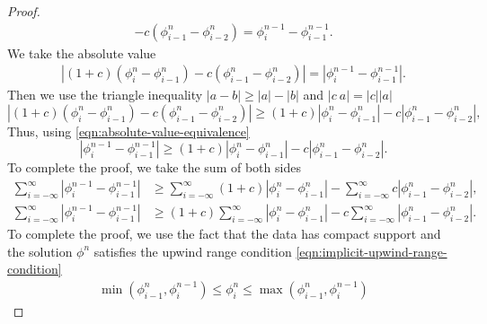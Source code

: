 \documentclass[../thesis.tex]{subfiles}
\begin{document}
\begin{theorem}
\begin{proof}
\begin{equation}
\begin{split}
        - c \left( \phi_{i-1}^{n} - \phi_{i-2}^{n} \right)
        = \phi_{i}^{n-1} - \phi_{i-1}^{n-1}.
    \end{split}
\end{equation}
We take the absolute value
\begin{equation}\label{eqn:absolute-value-equivalence}
    \begin{split}
        |(1+c)\left( \phi_{i}^{n} - \phi_{i-1}^{n} \right)
        - c \left( \phi_{i-1}^{n} - \phi_{i-2}^{n} \right)|
        = |\phi_{i}^{n-1} - \phi_{i-1}^{n-1}|.
    \end{split}
\end{equation}
Then we use the triangle inequality \(|a - b| \geq |a| - |b|\) and \(|c~a| = |c||a|\)
\begin{equation}
    |(1+c)\left( \phi_{i}^{n} - \phi_{i-1}^{n} \right)
    - c \left( \phi_{i-1}^{n} - \phi_{i-2}^{n} \right)|
    \geq
    (1+c)|\phi_{i}^{n} - \phi_{i-1}^{n}|
        - c |\phi_{i-1}^{n} - \phi_{i-2}^{n}|,
\end{equation}
Thus, using \eqref{eqn:absolute-value-equivalence}
\begin{equation}
    |\phi_{i}^{n-1} - \phi_{i-1}^{n-1}|
    \geq
    (1+c)|\phi_{i}^{n} - \phi_{i-1}^{n}|
    - c |\phi_{i-1}^{n} - \phi_{i-2}^{n}|.
\end{equation}
To complete the proof, we take the sum of both sides
\begin{equation}\label{eqn:tvd-proof-sums}
    \begin{split}
        \sum_{i=-\infty}^{\infty}|\phi_{i}^{n-1} - \phi_{i-1}^{n-1}|
        &\geq
        \sum_{i=-\infty}^{\infty}(1+c)|\phi_{i}^{n} - \phi_{i-1}^{n}|
        - \sum_{i=-\infty}^{\infty} c |\phi_{i-1}^{n} - \phi_{i-2}^{n}|,
        \\
        \sum_{i=-\infty}^{\infty}|\phi_{i}^{n-1} - \phi_{i-1}^{n-1}|
        &\geq
        (1+c)\sum_{i=-\infty}^{\infty}|\phi_{i}^{n} - \phi_{i-1}^{n}|
        - c \sum_{i=-\infty}^{\infty} |\phi_{i-1}^{n} - \phi_{i-2}^{n}|.
    \end{split}
\end{equation}
To complete the proof, we use the fact that the data has compact support and the solution \(\phi^{n}\) satisfies the upwind range condition
\eqref{eqn:implicit-upwind-range-condition}
\begin{equation}
    \begin{split}
        \min\left( \phi_{i-1}^{n},\phi_{i}^{n-1} \right)
        \leq
        \phi_{i}^{n}\leq
        \max\left( \phi_{i-1}^{n},\phi_{i}^{n-1} \right)

\end{split}
\end{equation}
\end{proof}
\end{theorem}
\end{document}
